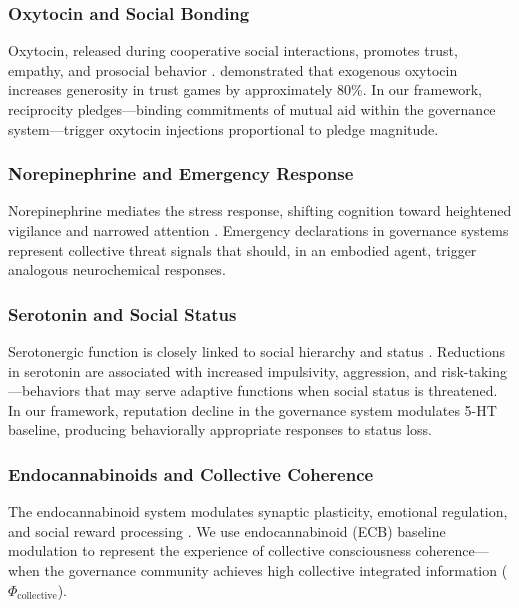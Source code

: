 \documentclass[11pt,a4paper]{article}
\begin{document}
\subsubsection{Oxytocin and Social Bonding}

Oxytocin, released during cooperative social interactions, promotes trust, empathy, and prosocial behavior \citep{zak2012moral, kosfeld2005oxytocin}.
\citet{zak2012moral} demonstrated that exogenous oxytocin increases generosity in trust games by approximately 80\%.
In our framework, reciprocity pledges---binding commitments of mutual aid within the governance system---trigger oxytocin injections proportional to pledge magnitude.

\subsubsection{Norepinephrine and Emergency Response}

Norepinephrine mediates the stress response, shifting cognition toward heightened vigilance and narrowed attention \citep{arnsten2009stress, aston2005integrative}.
Emergency declarations in governance systems represent collective threat signals that should, in an embodied agent, trigger analogous neurochemical responses.

\subsubsection{Serotonin and Social Status}

Serotonergic function is closely linked to social hierarchy and status \citep{crockett2009serotonin, raleigh1991serotonergic}.
Reductions in serotonin are associated with increased impulsivity, aggression, and risk-taking---behaviors that may serve adaptive functions when social status is threatened.
In our framework, reputation decline in the governance system modulates 5-HT baseline, producing behaviorally appropriate responses to status loss.

\subsubsection{Endocannabinoids and Collective Coherence}

The endocannabinoid system modulates synaptic plasticity, emotional regulation, and social reward processing \citep{trezza2010endocannabinoid, wei2015endocannabinoid}.
We use endocannabinoid (ECB) baseline modulation to represent the experience of collective consciousness coherence---when the governance community achieves high collective integrated information ($\Phi_{\mathrm{collective}}$).
\end{document}
